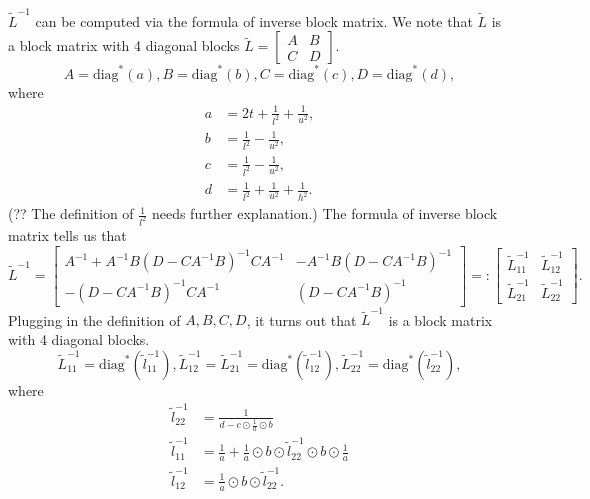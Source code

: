 \documentclass[final,onefignum,onetabnum]{siamart190516}
\begin{document}
$\widetilde{L}^{-1}$ can be computed via the formula of inverse block matrix. We note that $\widetilde{L}$ is a block matrix with 4 diagonal blocks $\widetilde{L} = \begin{bmatrix} A &B\\ C &D\end{bmatrix}$.
\begin{equation}
    A = \text{diag}^*(a), B = \text{diag}^*(b), C = \text{diag}^*(c), D = \text{diag}^*(d),
\end{equation}
where
\begin{equation}
    \begin{aligned}
        a &= 2t + \frac{1}{l^2} + \frac{1}{u^2},\\
        b &= \frac{1}{l^2} - \frac{1}{u^2},\\
        c &= \frac{1}{l^2} - \frac{1}{u^2},\\
        d &= \frac{1}{l^2} + \frac{1}{u^2} + \frac{1}{h^2}.
    \end{aligned}
\end{equation}
(?? The definition of $\frac{1}{l^2}$ needs further explanation.) The formula of inverse block matrix tells us that
\begin{equation}
    \widetilde{L}^{-1} = \begin{bmatrix} A^{-1} + A^{-1}B(D-CA^{-1}B)^{-1}CA^{-1} &-A^{-1}B(D-CA^{-1}B)^{-1}\\ -(D-CA^{-1}B)^{-1}CA^{-1} &(D-CA^{-1}B)^{-1}\end{bmatrix} =: \begin{bmatrix}
    \widetilde{L}^{-1}_{11} &\widetilde{L}^{-1}_{12}\\
    \widetilde{L}^{-1}_{21} &\widetilde{L}^{-1}_{22}
    \end{bmatrix}.
\end{equation}
Plugging in the definition of $A, B, C, D$, it turns out that $\widetilde{L}^{-1}$ is a block matrix with 4 diagonal blocks.
\begin{equation}
    \widetilde{L}^{-1}_{11} = \text{diag}^*(\widetilde{l}^{-1}_{11}), \widetilde{L}^{-1}_{12} = \widetilde{L}^{-1}_{21} = \text{diag}^*(\widetilde{l}^{-1}_{12}),
    \widetilde{L}^{-1}_{22} = \text{diag}^*(\widetilde{l}^{-1}_{22}),
\end{equation}
where
\begin{equation}
        \begin{aligned}
                        \widetilde{l}^{-1}_{22} &= \frac{1}{d - c\odot \frac{1}{a}\odot b}\\
        \widetilde{l}^{-1}_{11} &= \frac{1}{a} + \frac{1}{a}\odot b \odot \widetilde{l}^{-1}_{22} \odot b \odot \frac{1}{a}\\
                \widetilde{l}^{-1}_{12} &= \frac{1}{a}\odot b \odot \widetilde{l}^{-1}_{22}.
    \end{aligned}
\end{equation}
\end{document}
